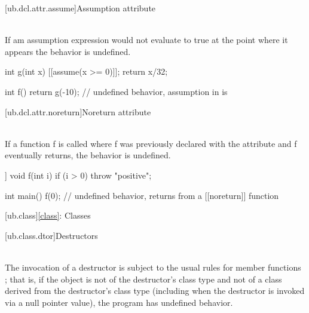 [ub.dcl.attr.assume]{Assumption attribute}

\pnum
{} \\
If am assumption expression would not evaluate to true at the point where it
appears the behavior is undefined.

\pnum
\begin{example}
\begin{codeblock}
int g(int x) {
  [[assume(x >= 0)]];
  return x/32;
}

int f() {
    return g(-10);      // undefined behavior, assumption in  is 
}
\end{codeblock}
\end{example}


[ub.dcl.attr.noreturn]{Noreturn attribute}

\pnum
{} \\
If a function f is called where f was previously declared with the  attribute and f eventually returns,
the behavior is undefined.

\pnum
\begin{example}
\begin{codeblock}
[[noreturn]] void f(int i) {
  if (i > 0)
    throw "positive";
}

int main() {
  f(0);         // undefined behavior, returns from a [[noreturn]] function
}
\end{codeblock}
\end{example}


[ub.class]{\ref{class}: Classes}

[ub.class.dtor]{Destructors}

\pnum
{} \\
The invocation of a destructor is subject to the usual rules for
member functions ; that is, if the object is not of the destructor's class type and not of a class derived
from the destructor's class type (including when the destructor is invoked via a null pointer value), the
program has undefined behavior.

